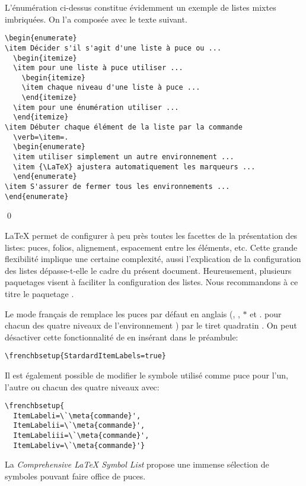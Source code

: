 \begin{exemple}
  L'énumération ci-dessus constitue évidemment un exemple de listes
  mixtes imbriquées. On l'a composée avec le texte suivant.
  \begin{demo}
\begin{lstlisting}
\begin{enumerate}
\item Décider s'il s'agit d'une liste à puce ou ...
  \begin{itemize}
  \item pour une liste à puce utiliser ...
    \begin{itemize}
    \item chaque niveau d'une liste à puce ...
    \end{itemize}
  \item pour une énumération utiliser ...
  \end{itemize}
\item Débuter chaque élément de la liste par la commande
  \verb=\item=.
  \begin{enumerate}
  \item utiliser simplement un autre environnement ...
  \item {\LaTeX} ajustera automatiquement les marqueurs ...
  \end{enumerate}
\item S'assurer de fermer tous les environnements ...
\end{enumerate}
\end{lstlisting}
  \end{demo}
  \qed
\end{exemple}

{\LaTeX} permet de configurer à peu près toutes les facettes de la
présentation des listes: puces, folios, alignement, espacement entre
les éléments, etc. Cette grande flexibilité implique une certaine
complexité, aussi l'explication de la configuration des listes
dépasse-t-elle le cadre du présent document. Heureusement, plusieurs
paquetages visent à faciliter la configuration des listes. Nous
recommandons à ce titre le paquetage  \citep{enumitem}.

\begin{conseil}
  Le mode français de  remplace les puces par défaut en
  anglais ({\textbullet}, {\textendash}, $\ast$ et $.$ pour chacun
  des quatre niveaux de l'environnement ) par le tiret
  quadratin {\textemdash}. On peut désactiver cette fonctionnalité de
   en insérant dans le préambule:
\begin{lstlisting}
\frenchbsetup{StardardItemLabels=true}
\end{lstlisting}
  Il est également possible de modifier le symbole utilisé comme
  puce pour l'un, l'autre ou chacun des quatre niveaux avec:
\begin{lstlisting}
\frenchbsetup{
  ItemLabeli=\`\meta{commande}',
  ItemLabelii=\`\meta{commande}',
  ItemLabeliii=\`\meta{commande}',
  ItemLabeliv=\`\meta{commande}'}
\end{lstlisting}
  La \emph{Comprehensive {\LaTeX} Symbol List} \citep{comprehensive}
  propose une immense sélection de symboles pouvant faire office de
  puces.
\end{conseil}

